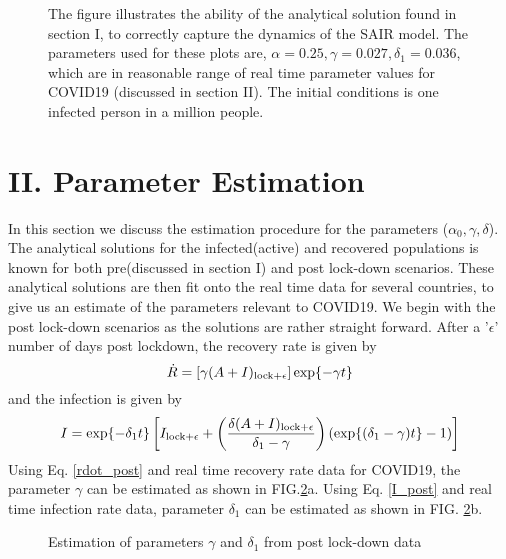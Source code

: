 \documentclass[aps,floatfix,prl,superscriptaddress]{revtex4}
\begin{document}
\begin{figure}[h]
	\caption{\label{fig2} The figure illustrates the ability of the analytical solution found in section I, to correctly capture the dynamics of the SAIR model. The parameters used for these plots are, $\alpha=0.25, \gamma = 0.027, \delta_1 = 0.036$, which are in reasonable range of real time parameter values for COVID19 (discussed in section II). The initial conditions is one infected person in a million people. } 
\end{figure}

\section{II. Parameter Estimation}
In this section we discuss the estimation procedure for the parameters ($\alpha_0, \gamma, \delta$). The analytical solutions for the infected(active) and recovered populations is known for both pre(discussed in section I) and post lock-down scenarios. These analytical solutions are then fit onto the real time data for several countries, to give us an estimate of the parameters relevant to COVID19. We begin with the post lock-down scenarios as the solutions are rather straight forward. After a '$\epsilon$' number of days post lockdown, the recovery rate is given by
\begin{equation}
\label{rdot_post}
\dot{R} =  \left[ \gamma (A+I)_{\rm lock + \epsilon} \right] \exp \{ -\gamma t\}
\end{equation}
and the infection is given by
\begin{equation}
\label{I_post}
I = \exp\{ -\delta_1 t \} \left[ I_{\rm lock+\epsilon} + \left( \frac{\delta(A+I)_{\rm lock+\epsilon}}{\delta_1-\gamma} \right) \left( \exp\{(\delta_1-\gamma)t \}-1\right)\right]
\end{equation}
Using Eq. \eqref{rdot_post} and real time recovery rate data for COVID19, the parameter $\gamma$ can be estimated as shown in FIG.\ref{fig3}a. Using Eq. \eqref{I_post} and real time infection rate data, parameter $\delta_1$ can be estimated as shown in FIG. \ref{fig3}b.   
\begin{figure}[h]
	\caption{\label{fig3}Estimation of parameters $\gamma$ and $\delta_1$ from post lock-down data}
\end{figure}
\end{document}
